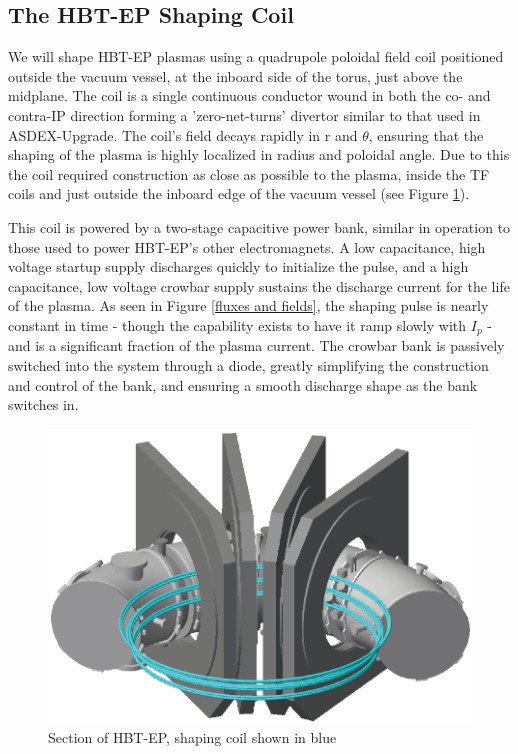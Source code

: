 \documentclass[aps,prl,twocolumn,superscriptaddress,groupedaddress]{revtex4}  %
\begin{document}
\subsection{The HBT-EP Shaping Coil}
    We will shape HBT-EP plasmas using a quadrupole poloidal field coil positioned outside the vacuum vessel, at the inboard side of the torus, just above the midplane.  The coil is a single continuous conductor wound in both the co- and contra-IP direction forming a 'zero-net-turns' divertor similar to that used in ASDEX-Upgrade\cite{Keilhacker}.  The coil's field decays rapidly in r and $\theta$, ensuring that the shaping of the plasma is highly localized in radius and poloidal angle.  Due to this the coil required construction as close as possible to the plasma, inside the TF coils and just outside the inboard edge of the vacuum vessel (see Figure \ref{Coil_HBT_Section}).\par
This coil is powered by a two-stage capacitive power bank, similar in operation to those used to power HBT-EP's other electromagnets\cite{Gates}. A low capacitance, high voltage startup supply discharges quickly to initialize the pulse, and a high capacitance, low voltage crowbar supply sustains the discharge current for the life of the plasma.  As seen in Figure \ref{fluxes and fields}, the shaping pulse is nearly constant in time - though the capability exists to have it ramp slowly with $I_p$ - and is a significant fraction of the plasma current.  The crowbar bank is passively switched into the system through a diode, greatly simplifying the construction and control of the bank, and ensuring a smooth discharge shape as the bank switches in.
	
\begin{figure}[htb]
	\centering
\includegraphics[scale=.35]{../Plots/HBT_section_cropped.png}\caption{Section of HBT-EP, shaping coil shown in blue}
	\label{Coil_HBT_Section}
	\end{figure}
\end{document}
